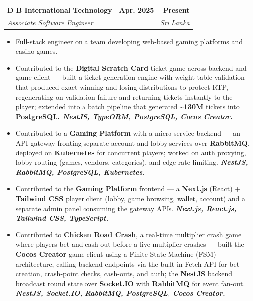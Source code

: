 \documentclass[letterpaper,11pt]{article}
\makeatletter
\newcommand{\resumeItem}[1]{
  \item\small{
    {#1 \vspace{1pt}}
  }
}
\newcommand{\resumeSubheading}[4]{
  \vspace{2pt}\item
    \begin{tabular*}{1.0\textwidth}[t]{l@{\extracolsep{\fill}}r}
      \textbf{#1} & \textbf{\small #2} \\
      \textit{\small#3} & \textit{\small #4} \\
    \end{tabular*}\vspace{-3pt}
}
\newcommand{\resumeItemListStart}{\begin{itemize}}
\newcommand{\resumeItemListEnd}{\end{itemize}\vspace{-2pt}}
\makeatother
\begin{document}
    \resumeSubheading
      {D B International Technology}{Apr. 2025 -- Present}
      {Associate Software Engineer}{Sri Lanka}
      \resumeItemListStart
        \resumeItem{Full-stack engineer on a team developing web-based gaming platforms and casino games.}
        \resumeItem{Contributed to the \textbf{Digital Scratch Card} ticket game across backend and game client --- built a ticket-generation engine with weight-table validation that produced exact winning and losing distributions to protect RTP, regenerating on validation failure and returning tickets instantly to the player; extended into a batch pipeline that generated \textasciitilde{}\textbf{130M} tickets into \textbf{PostgreSQL. \emph{NestJS, TypeORM, PostgreSQL, Cocos Creator.}}}
        \resumeItem{Contributed to a \textbf{Gaming Platform} with a micro-service backend --- an API gateway fronting separate account and lobby services over \textbf{RabbitMQ}, deployed on \textbf{Kubernetes} for concurrent players; worked on auth proxying, lobby routing (games, vendors, categories), and edge rate-limiting.\textbf{ \emph{NestJS, RabbitMQ, PostgreSQL, Kubernetes.}}}
        \resumeItem{Contributed to the \textbf{Gaming Platform} frontend --- a \textbf{Next.js} (React) + \textbf{Tailwind CSS} player client (lobby, game browsing, wallet, account) and a separate admin panel consuming the gateway APIs.\textbf{ \emph{Next.js, React.js, Tailwind CSS, TypeScript.}}}
        \resumeItem{Contributed to \textbf{Chicken Road Crash}, a real-time multiplier crash game where players bet and cash out before a live multiplier crashes --- built the \textbf{Cocos Creator} game client using a Finite State Machine (FSM) architecture, calling backend endpoints via the built-in Fetch API for bet creation, crash-point checks, cash-outs, and auth; the \textbf{NestJS} backend broadcast round state over \textbf{Socket.IO} with \textbf{RabbitMQ} for event fan-out.\textbf{ \emph{NestJS, Socket.IO, RabbitMQ, PostgreSQL, Cocos Creator.}}}

      \resumeItemListEnd
\end{document}

